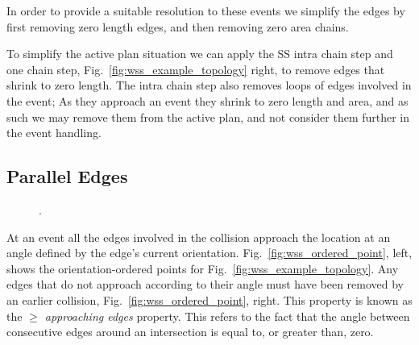 In order to provide a suitable resolution to these events we simplify the edges by first removing zero length edges, and then removing zero area chains.

To simplify the active plan situation we can apply the SS intra chain step and one chain step, Fig.~\ref{fig:wss_example_topology} right, to remove edges that shrink to zero length. The intra chain step also removes loops of edges involved in the event; As they approach an event they shrink to zero length and area, and as such we may remove them from the active plan, and not consider them further in the event handling.

\subsection{Parallel Edges}



\begin{figure}
  \centering
  \def\svgwidth{1.0\columnwidth}
  
  \caption[A MWSS event with four parallel edges]{\label{fig:skel_impossible}.}
\end{figure}




%  

At an event all the edges involved in the collision approach the location at an angle defined by the edge's current orientation. Fig.~\ref{fig:wss_ordered_point}, left, shows the orientation-ordered points for Fig.~\ref{fig:wss_example_topology}. Any edges that do not approach according to their angle must have been removed by an earlier collision, Fig.~\ref{fig:wss_ordered_point}, right. This property is known as the \emph{$\ge$ approaching edges} property. This refers to the fact that the angle between consecutive edges around an intersection is equal to, or greater than, zero.

